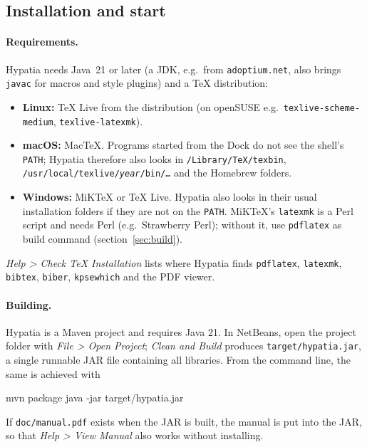 \documentclass[11pt]{article}
\newcommand{\menu}[1]{\textsf{\textit{#1}}}
\newcommand{\file}[1]{\texttt{#1}}
\begin{document}
    \subsection{Installation and start}

    \paragraph{Requirements.}\label{sec:install}     Hypatia needs Java~21 or later (a JDK, e.g.\ from \texttt{adoptium.net}, also brings \verb+javac+ for macros and style plugins) and a TeX distribution:
    \begin{itemize}
        \itemsep-1mm
        \item \textbf{Linux:} TeX Live from the distribution (on openSUSE e.g.\ \verb+texlive-scheme-medium+, \verb+texlive-latexmk+).
        \item \textbf{macOS:} MacTeX. Programs started from the Dock do not see the shell's \verb+PATH+; Hypatia therefore also looks in \file{/Library/TeX/texbin}, \file{/usr/local/texlive/\textit{year}/bin/\ldots} and the Homebrew folders.
        \item \textbf{Windows:} MiKTeX or TeX Live. Hypatia also looks in their usual installation folders if they are not on the \verb+PATH+. MiKTeX's \verb+latexmk+ is a Perl script and needs Perl (e.g.\ Strawberry Perl); without it, use \verb+pdflatex+ as build command (section~\ref{sec:build}).
    \end{itemize}
    \menu{Help > Check TeX Installation} lists where Hypatia finds \verb+pdflatex+, \verb+latexmk+, \verb+bibtex+, \verb+biber+, \verb+kpsewhich+ and the PDF viewer.

    \paragraph{Building.}     Hypatia is a Maven project and requires Java 21. In NetBeans, open the project folder with \menu{File > Open Project}; \menu{Clean and Build} produces \file{target/hypatia.jar}, a single runnable JAR file containing all libraries. From the command line, the same is achieved with
    \begin{Code}
mvn package
java -jar target/hypatia.jar
    \end{Code}

    If \file{doc/manual.pdf} exists when the JAR is built, the manual is put into the JAR, so that \menu{Help > View Manual} also works without installing.
\end{document}
